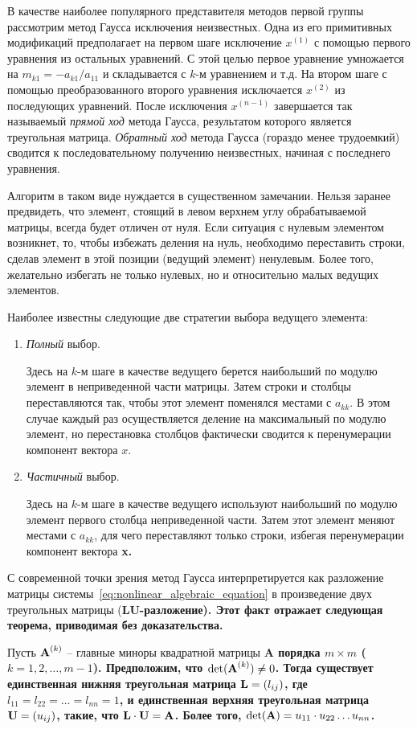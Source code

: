 В качестве наиболее популярного представителя методов первой группы рассмотрим метод Гаусса исключения неизвестных. Одна
из его примитивных модификаций предполагает на первом шаге исключение $\displaystyle x^{(1)}$ с помощью первого уравнения
из остальных уравнений. С этой целью первое уравнение умножается на $m_{k1} = -a_{k1}/a_{11}$ и складывается с $k$-м
уравнением и т.д. На втором шаге с помощью преобразованного второго уравнения исключается
$\displaystyle x^{(2)}$ из последующих уравнений. После исключения $\displaystyle x^{(n-1)}$ завершается так называемый
\emph{прямой ход} метода Гаусса, результатом которого является треугольная матрица. \emph{Обратный ход} метода Гаусса
(гораздо менее трудоемкий) сводится к последовательному получению неизвестных, начиная с последнего уравнения.

Алгоритм в таком виде нуждается в существенном замечании. Нельзя заранее предвидеть, что элемент, стоящий в левом верхнем
углу обрабатываемой матрицы, всегда будет отличен от нуля. Если ситуация с нулевым элементом возникнет, то, чтобы
избежать деления на нуль, необходимо переставить строки, сделав элемент в этой позиции (ведущий элемент) ненулевым.
Более того, желательно избегать не только нулевых, но и относительно малых ведущих элементов.

Наиболее известны следующие две стратегии выбора ведущего элемента:
\begin{enumerate}
    \item \emph{Полный} выбор.

    Здесь на $k$-м шаге в качестве ведущего берется наибольший по модулю элемент в неприведенной части матрицы. Затем
    строки и столбцы переставляются так, чтобы этот элемент поменялся местами с $a_{kk}$. В этом случае каждый раз
    осуществляется деление на максимальный по модулю элемент, но перестановка столбцов фактически сводится к
    перенумерации компонент вектора $x$.

    \item \emph{Частичный} выбор.

    Здесь на $k$-м шаге в качестве ведущего используют наибольший по модулю элемент первого столбца неприведенной
    части. Затем этот элемент меняют местами с $a_{kk}$, для чего переставляют только строки, избегая перенумерации
    компонент вектора \bf{x}.
\end{enumerate}

С современной точки зрения метод Гаусса интерпретируется как разложение матрицы системы~\eqref{eq:nonlinear_algebraic_equation}
в произведение двух треугольных матрицы (\bf{LU}-разложение). Этот факт отражает следующая теорема, приводимая без
доказательства.
\begin{theorem}
    Пусть $\displaystyle \bf{A}^{(k)}$ -- главные миноры квадратной матрицы \bf{A} порядка $m \times m$ ($k=1,2,\dots,m-1$).
    Предположим, что $\det(\bf{A}^{(k)}) \neq 0$. Тогда существует единственная нижняя треугольная матрица
    $\bf{L} = (l_{ij})$, где $l_{11} = l_{22} = \dots = l_{nn} = 1$, и единственная верхняя треугольная матрица
    $\bf{U} = (u_{ij})$, такие, что $\bf{L} \cdot \bf{U} = \bf{A}$. Более того, $\det(\bf{A}) = u_{11} \cdot u_{22} \dots u_{nn}$.
\end{theorem}

